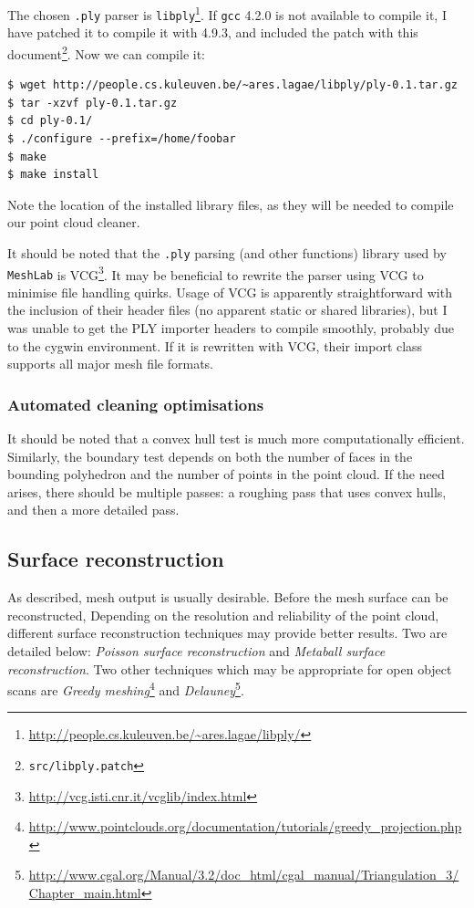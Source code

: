 \documentclass{article}
\begin{document}
The chosen {\tt .ply} parser is {\tt libply}\footnote{\url{http://people.cs.kuleuven.be/~ares.lagae/libply/}}. If {\tt gcc} 4.2.0 is not available to compile it, I have patched it to compile it with 4.9.3, and included the patch with this document\footnote{{\tt src/libply.patch}}. Now we can compile it:

\begin{lstlisting}
$ wget http://people.cs.kuleuven.be/~ares.lagae/libply/ply-0.1.tar.gz
$ tar -xzvf ply-0.1.tar.gz
$ cd ply-0.1/
$ ./configure --prefix=/home/foobar
$ make
$ make install
\end{lstlisting}

Note the location of the installed library files, as they will be needed to compile our point cloud cleaner.

It should be noted that the {\tt .ply} parsing (and other functions) library used by {\tt MeshLab} is VCG\footnote{\url{http://vcg.isti.cnr.it/vcglib/index.html}}. It may be beneficial to rewrite the parser using VCG to minimise file handling quirks. Usage of VCG is apparently straightforward with the inclusion of their header files (no apparent static or shared libraries), but I was unable to get the PLY importer headers to compile smoothly, probably due to the cygwin environment. If it is rewritten with VCG, their import class supports all major mesh file formats.


\subsubsection{Automated cleaning optimisations}

It should be noted that a convex hull test is much more computationally efficient. Similarly, the boundary test depends on both the number of faces in the bounding polyhedron and the number of points in the point cloud. If the need arises, there should be multiple passes: a roughing pass that uses convex hulls, and then a more detailed pass.

\subsection{Surface reconstruction}
As described, mesh output is usually desirable. Before the mesh surface can be reconstructed, 
Depending on the resolution and reliability of the point cloud, different surface reconstruction techniques may provide better results. Two are detailed below: \emph{Poisson surface reconstruction} and \emph{Metaball surface reconstruction}. Two other techniques which may be appropriate for open object scans are \emph{Greedy meshing}\footnote{\url{http://www.pointclouds.org/documentation/tutorials/greedy\_projection.php}} and \emph{Delauney}\footnote{\url{http://www.cgal.org/Manual/3.2/doc_html/cgal_manual/Triangulation_3/Chapter_main.html}}.
\end{document}
